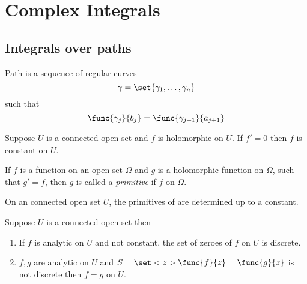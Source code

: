 \chapter{Complex Integrals}
\section{Integrals over paths}
Path is a sequence of regular curves 
\begin{equation*}
    \gamma = \set{\gamma_1 , \dots , \gamma_n}
\end{equation*}
such that 
\begin{equation*}
    \func{\gamma_j}{b_j} = \func{\gamma_{j+1}}{a_{j+1}}
\end{equation*}

\begin{theorem}
    Suppose \(U\) is a connected open set and \(f\) is holomorphic on \(U\). If \(f' = 0\) then \(f\) is constant on \(U\).
\end{theorem}

\begin{definition}
    If \(f\) is a function on an open set \(\Omega\) and \(g\) is a holomorphic function on \(\Omega\), such that \(g' = f\), then \(g\) is called a \textit{primitive} if \(f\) on \(\Omega\).
\end{definition}

\begin{corollary}
    On an connected open set \(U\), the primitives of are determined up to a constant.
\end{corollary}

\begin{theorem}
    Suppose \(U\) is a connected open set then 
    \begin{enumerate}
        \item If \(f\) is analytic on \(U\) and not constant, the set of zeroes of \(f\) on \(U\) is discrete.
        \item \(f,g\) are analytic on \(U\) and \(S = \set<z>{\func{f}{z} = \func{g}{z}}\) is not discrete then \(f = g\) on \(U\).
    \end{enumerate}
\end{theorem}

